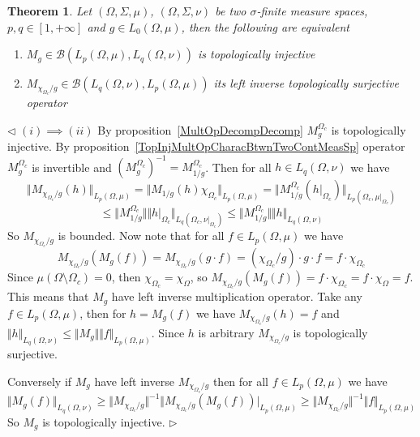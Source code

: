 \documentclass[12pt]{article}
\newtheorem{theorem}{Theorem}[subsection]
\newenvironment{proof}{\par $\triangleleft$}{$\triangleright$}
\begin{document}
\begin{theorem}\label{TopInjMultOpDescBtwnTwoMeasSp}
    Let $(\Omega,\Sigma,\mu)$, $(\Omega,\Sigma,\nu)$ be two $\sigma$-finite
    measure spaces, $p,q\in[1,+\infty]$ and $g\in L_0(\Omega,\mu)$, then
    the following are equivalent
    \begin{enumerate}[label = (\roman*)]
        \item $M_g\in\mathcal{B}(L_p(\Omega,\mu),L_q(\Omega,\nu))$ is
              topologically injective

        \item $M_{\chi_{\Omega_c}/g}\in
                \mathcal{B}(L_q(\Omega,\nu), L_p(\Omega,\mu))$ its left inverse
              topologically surjective operator
    \end{enumerate}
\end{theorem}
\begin{proof}
    $(i)\implies (ii)$ By proposition~\ref{MultOpDecompDecomp}
    $M_g^{\Omega_c}$ is topologically injective. By
    proposition~\ref{TopInjMultOpCharacBtwnTwoContMeasSp} operator
    $M_g^{\Omega_c}$ is invertible and
    ${(M_g^{\Omega_c})}^{-1}=M_{1/g}^{\Omega_c}$. Then for
    all $h\in L_q(\Omega,\nu)$ we have
    $$
        \Vert M_{\chi_{\Omega_c}/g}(h)\Vert_{L_p(\Omega,\mu)}= \Vert
        M_{1/g}(h)\chi_{\Omega_c}\Vert_{L_p(\Omega,\mu)}= \Vert
        M_{1/g}^{\Omega_c}(h|_{\Omega_c})\Vert_{L_p(\Omega_c,\mu|_{\Omega_c})}
    $$
    $$
        \leq\Vert M_{1/g}^{\Omega_c}\Vert\Vert
        h|_{\Omega_c}\Vert_{L_q(\Omega_c,\nu|_{\Omega_c})} \leq\Vert
        M_{1/g}^{\Omega_c}\Vert\Vert h\Vert_{L_q(\Omega,\nu)}
    $$
    So $M_{\chi_{\Omega_c}/g}$ is bounded. Now note that for
    all $f\in L_p(\Omega,\mu)$ we have
    $$
        M_{\chi_{\Omega_c}/g}(M_g(f)) =M_{\chi_{\Omega_c}/g}(g\cdot f)
        =(\chi_{\Omega_c}/g)\cdot g\cdot f =f\cdot\chi_{\Omega_c}
    $$
    Since $\mu(\Omega\setminus\Omega_c)=0$, then
    $\chi_{\Omega_c}=\chi_{\Omega}$, so
    $M_{\chi_{\Omega_c}/g}(M_g(f))=f\cdot\chi_{\Omega_c}=f\cdot\chi_{\Omega}=f$.
    This means that $M_g$ have left inverse multiplication operator. Take
    any $f\in L_p(\Omega,\mu)$, then for $h=M_g(f)$ we have
    $M_{\chi_{\Omega_c}/g}(h)=f$ and
    $\Vert h\Vert_{L_q(\Omega,\nu)}
        \leq\Vert M_g\Vert\Vert f\Vert_{L_p(\Omega,\mu)}$. Since $h$ is
    arbitrary $M_{\chi_{\Omega_c}/g}$ is topologically surjective.

    Conversely if $M_g$ have left inverse $M_{\chi_{\Omega_c}/g}$
    then for all $f\in L_p(\Omega,\mu)$ we have
    $$
        \Vert M_g(f)\Vert_{L_q(\Omega,\nu)} \geq\Vert
        M_{\chi_{\Omega_c}/g}\Vert^{-1}\Vert
        M_{\chi_{\Omega_c}/g}(M_g(f))\vert_{L_p(\Omega,\mu)} \geq\Vert
        M_{\chi_{\Omega_c}/g}\Vert^{-1}\Vert f\Vert_{L_p(\Omega,\mu)}
    $$
    So $M_g$ is topologically injective.
\end{proof}
\end{document}
